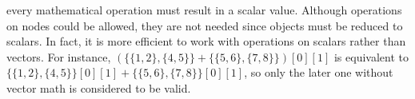 every mathematical operation must result in a scalar value.  Although operations on  nodes could be allowed, they are not needed since  objects must be reduced to scalars.  In fact, it is more efficient to work with operations on scalars rather than vectors. For instance, $(\{\{1,2\},\{4,5\}\}+\{\{5,6\},\{7,8\}\})[0][1]$ is equivalent to $\{\{1,2\},\{4,5\}\}[0][1] + \{\{5,6\},\{7,8\}\}[0][1]$, so only the later one without vector math is considered to be valid.

